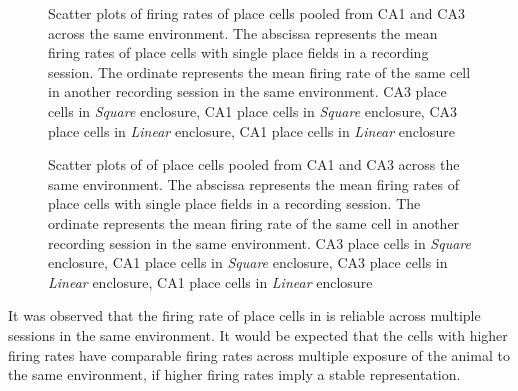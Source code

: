 \begin{figure}[htb!]
\centering
{}

\label{fig:rateremapping}
\caption[Rate Remapping]{Scatter plots of firing rates of place cells pooled from CA1 and CA3  across the same environment. The abscissa represents the mean firing rates of place cells with single place fields in a recording session. The ordinate represents the mean firing rate of the same cell in another recording session in the same environment.  CA3 place cells in \emph{Square} enclosure,  CA1 place cells in \emph{Square} enclosure,  CA3 place cells in \emph{Linear} enclosure,  CA1 place cells in \emph{Linear} enclosure}
\end{figure}



\begin{figure}[htb!]
\centering
{}

\label{fig:pkDist}
\caption[Place field Peak distances]{Scatter plots of of place cells pooled from CA1 and CA3  across the same environment. The abscissa represents the mean firing rates of place cells with single place fields in a recording session. The ordinate represents the mean firing rate of the same cell in another recording session in the same environment.  CA3 place cells in \emph{Square} enclosure,  CA1 place cells in \emph{Square} enclosure,  CA3 place cells in \emph{Linear} enclosure,  CA1 place cells in \emph{Linear} enclosure}
\end{figure}
It was observed that the firing rate of place cells in is reliable across multiple sessions in the same environment. It would be expected that the cells with higher firing rates have comparable firing rates across multiple exposure of the animal to the same environment, if higher firing rates imply a stable representation. 

